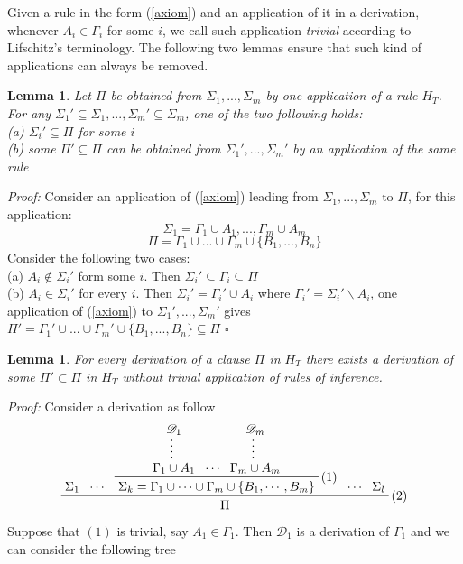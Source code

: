 \documentclass[a4paper,12pt,oneside]{book}
\newtheorem{lemma}[theorem]{Lemma}
\newcommand{\D}{\mathscr{D}}
\newcommand*{\QED}{\hfill\ensuremath{\square}}
\begin{document}
Given a rule in the form (\ref{axiom}) and an application of it in a derivation, whenever $A_i \in \Gamma_i$ for some $i$, we call such application \textit{trivial} according to Lifschitz's terminology. The following two lemmas ensure that such kind of applications can always be removed.

\begin{lemma}\label{lemma1}
Let $\Pi$ be obtained from $\Sigma_1,...,\Sigma_m$ by one application of a rule $H_T$. For any $\Sigma_1' \subseteq \Sigma_1,...,\Sigma_m' \subseteq \Sigma_m  $, one of the two following holds:\\
(a) $\Sigma_i' \subseteq \Pi$ for some $i$\\
(b) some $\Pi '\subseteq\Pi$ can be obtained from $\Sigma_1 ',...,\Sigma_m '$ by an application of the same rule
\end{lemma}

\emph{Proof:} Consider an application of (\ref{axiom}) leading from  $\Sigma_1,...,\Sigma_m$ to $\Pi$, for this application:
$$\Sigma_1=\Gamma_1\cup A_1,...,\Gamma_m\cup A_m  $$
$$\Pi=\Gamma_1\cup ...\cup\Gamma_m\cup\{B_1,...,B_n\}$$
Consider the following two cases:\\
(a) $A_i \notin \Sigma_i '$ form some $i$. Then $\Sigma_i '\subseteq\Gamma_i\subseteq\Pi$
\\(b) $A_i \in \Sigma_i '$ for every $i$. Then $\Sigma_i '=\Gamma_i ' \cup A_i$ where $\Gamma_i '=\Sigma_i '\backslash A_i $, one application of (\ref{axiom}) to 
$\Sigma_1 ',...,\Sigma_m '$ gives 
$\Pi '=\Gamma_1 '\cup ...\cup\Gamma_m '\cup\{B_1,...,B_n\}\subseteq\Pi$
\QED

\newpage
\begin{lemma}
For every derivation of a clause $\Pi$ in $H_T$ there exists a derivation of some $\Pi '\subset\Pi $ in $H_T$ without trivial application of rules of inference.
\end{lemma}

\textit{Proof:} Consider a derivation as follow
\begin{equation*}
\prftree[r]{(2)}{\prfassumption{\Sigma_1}}{\cdots}
{ \prftree[r]{(1)}{ \prfsummary{\D_1}{\Gamma_1\cup A_1} } {\cdots } { \prfsummary{\D_m}{\Gamma_m\cup A_m}} {\Sigma_k=\Gamma_1\cup\cdots\cup\Gamma_m\cup\{B_1,\cdots,B_m\}} }
{\cdots}{\prfassumption{\Sigma_l}}{\Pi}
\end{equation*}
Suppose that $(1)$ is trivial, say $A_1\in\Gamma_1$. Then $\D_1$ is a derivation of $\Gamma_1$ and we can consider the following tree
\end{document}
